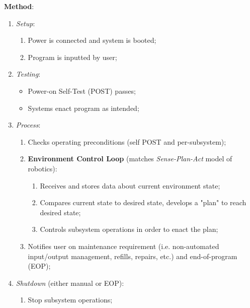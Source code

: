 \documentclass{report}
\begin{document}
\textbf{Method}:
\begin{enumerate}
    \item \textit{Setup}:
    \begin{enumerate}
        \item Power is connected and system is booted;
        \item Program is inputted by user;
    \end{enumerate}
    \item \textit{Testing}:
    \begin{itemize}
        \item Power-on Self-Test (POST) passes;
        \item Systems enact program as intended;
    \end{itemize}
    \item \textit{Process}:
    \begin{enumerate}
        \item Checks operating preconditions (self POST and per-subsystem);
        \item \textbf{Environment Control Loop} (matches \textit{Sense-Plan-Act} model of robotics):
        \begin{enumerate}
            \item Receives and stores data about current environment state;
            \item Compares current state to desired state, develops a "plan" to reach desired state;
            \item Controls subsystem operations in order to enact the plan;
        \end{enumerate}
        \item Notifies user on maintenance requirement (i.e. non-automated input/output management, refills, repairs, etc.) and end-of-program (EOP);
    \end{enumerate}
    \item \textit{Shutdown} (either manual or EOP):
    \begin{enumerate}
        \item Stop subsystem operations;
    \end{enumerate}
\end{enumerate}
\end{document}

